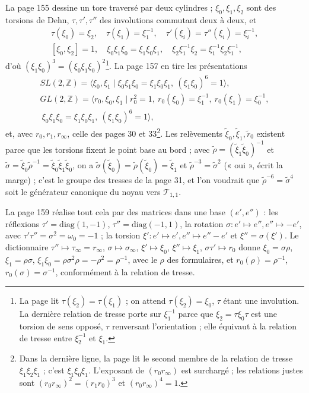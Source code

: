 \documentclass[11pt,a4paper]{article}
\begin{document}
La page 155 dessine un tore traversé par deux cylindres ; $\xi_0, \xi_1, \xi_2$
sont des torsions de Dehn, $\tau, \tau', \tau''$ des involutions commutant deux
à deux, et
\[
\begin{gathered}
\tau(\xi_0) = \xi_2, \quad \tau(\xi_1) = \xi_1^{-1}, \quad \tau'(\xi_i) = \tau''(\xi_i) = \xi_i^{-1}, \\
[\xi_0, \xi_2] = 1, \quad \xi_0\xi_1\xi_0 = \xi_1\xi_0\xi_1, \quad \xi_2\xi_1^{-1}\xi_2 = \xi_1^{-1}\xi_2\xi_1^{-1},
\end{gathered}
\]
d'où $(\xi_1\xi_0)^3 = (\xi_0\xi_1\xi_0)^2$\footnote{La page lit
$\tau(\xi_2) = \tau(\xi_1)$ ; on attend $\tau(\xi_2) = \xi_0$, $\tau$ étant une
involution. La dernière relation de tresse porte sur $\xi_1^{-1}$ parce que
$\xi_2 = \tau\xi_0\tau$ est une torsion de sens opposé, $\tau$ renversant
l'orientation ; elle équivaut à la relation de tresse entre $\xi_2^{-1}$ et
$\xi_1$.}. La page 157 en tire les présentations
\[
\begin{gathered}
SL(2, \mathbb{Z}) = \langle \xi_0, \xi_1 \mid \xi_0\xi_1\xi_0 = \xi_1\xi_0\xi_1,\ (\xi_1\xi_0)^6 = 1 \rangle, \\
GL(2, \mathbb{Z}) = \langle r_0, \xi_0, \xi_1 \mid r_0^2 = 1,\ r_0(\xi_0) = \xi_1^{-1},\ r_0(\xi_1) = \xi_0^{-1}, \\
\ \xi_0\xi_1\xi_0 = \xi_1\xi_0\xi_1,\ (\xi_1\xi_0)^6 = 1 \rangle,
\end{gathered}
\]
et, avec $r_0, r_1, r_\infty$, celle des pages 30 et 33\footnote{Dans la
dernière ligne, la page lit le second membre de la relation de tresse
$\xi_1\xi_2\xi_1$ ; c'est $\xi_1\xi_0\xi_1$. L'exposant de $(r_0r_\infty)$ est
surchargé ; les relations justes sont $(r_0r_\infty)^2 = (r_1r_0)^3$ et
$(r_0r_\infty)^4 = 1$.}. Les relèvements $\tilde\xi_0, \tilde\xi_1, \tilde r_0$
existent parce que les torsions fixent le point base au bord ; avec
$\tilde\rho = (\tilde\xi_1\tilde\xi_0)^{-1}$ et
$\tilde\sigma = \tilde\xi_0\tilde\rho^{-1} = \tilde\xi_0\tilde\xi_1\tilde\xi_0$, on a
$\tilde\sigma(\tilde\xi_0) = \tilde\rho(\tilde\xi_0) = \tilde\xi_1$ et
$\tilde\rho^{-3} = \tilde\sigma^2$ (« oui », écrit la marge) ; c'est le groupe
des tresses de la page 31, et l'on voudrait que $\tilde\rho^{-6} = \tilde\sigma^4$
soit le générateur canonique du noyau vers $\mathcal{T}_{1,1}$.

La page 159 réalise tout cela par des matrices dans une base $(e', e'')$ : les
réflexions $\tau' = \mathrm{diag}(1, -1)$, $\tau'' = \mathrm{diag}(-1, 1)$, la
rotation $\sigma : e' \mapsto e'', e'' \mapsto -e'$, avec
$\tau'\tau'' = \sigma^2 = \omega_0 = -1$ ; la torsion
$\xi' : e' \mapsto e', e'' \mapsto e'' - e'$ et $\xi'' = \sigma(\xi')$. Le
dictionnaire $\tau'' \mapsto \tau_\infty = r_\infty$, $\sigma \mapsto \sigma_\infty$,
$\xi' \mapsto \xi_0$, $\xi'' \mapsto \xi_1$, $\sigma\tau' \mapsto r_0$ donne
$\xi_0 = \sigma\rho$, $\xi_1 = \rho\sigma$, $\xi_1\xi_0 = \rho\sigma^2\rho = -\rho^2 = \rho^{-1}$,
avec le $\rho$ des formulaires, et
$r_0(\rho) = \rho^{-1}$, $r_0(\sigma) = \sigma^{-1}$, conformément à la
relation de tresse.
\end{document}
